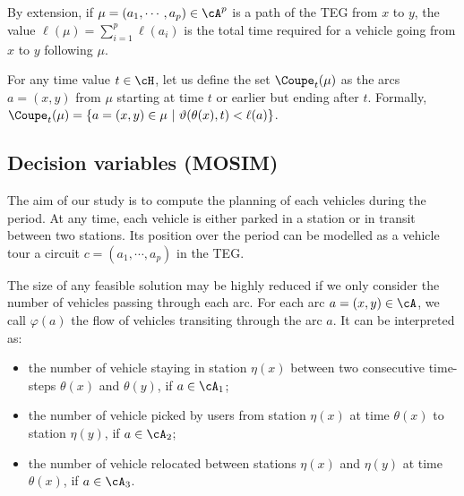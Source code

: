 \begin{bibunit}[ieeetr]
By extension, if $\mu= (a_1, \cdots, a_p) \in {\cA}^p$ is a path of the TEG from $x$ to $y$, the value
$\ell(\mu)=\sum_{i=1}^p \ell(a_i)$ is the total time required for a vehicle going from $x$ to
$y$ following $\mu$.

For any time value $t\in \cH$, let us define the set ${\Coupe}_t(\mu)$ as
the arcs $a=(x,y)$ from $\mu$ starting at time $t$ or earlier but ending after
$t$.
Formally,
${\Coupe}_t(\mu)=\{a=(x,y)\in \mu~|~\vartheta(\theta(x),t)<\ell(a)\}$.


\subsection{Decision variables (MOSIM)}


The aim of our study is to compute the planning of each vehicles during the period. 
At any time, each vehicle is either parked in a station or in transit between two stations. Its position over the period can be modelled as a vehicle tour \ie a circuit $c=(a_1,\cdots, a_p)$ in the TEG.

The size of any feasible solution may be highly reduced if we only consider the number of vehicles passing through each arc.  
For each arc $a =(x,y) \in {\cA}$, we call $\varphi(a)$ the flow of vehicles transiting through the arc $a$. It can be interpreted as:
\begin{itemize}
\item the number of vehicle staying in station $\eta(x)$ between two consecutive time-steps $\theta(x)$ and $\theta(y)$, if $a \in {\cA}_1$;
\item the number of vehicle picked by users from station $\eta(x)$ at time $\theta(x)$ to station $\eta(y)$, if $a \in {\cA}_2$;
\item the number of vehicle relocated between stations $\eta(x)$ and $\eta(y)$ at time $\theta(x)$, if $a \in {\cA}_3$.
\end{itemize}


\end{bibunit}
